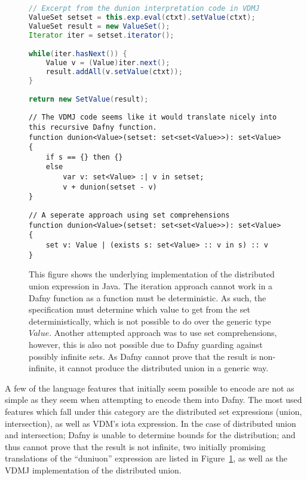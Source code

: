 \documentclass{entcs}
\begin{document}
\begin{figure}[h]
	\begin{center}
        \begin{lstlisting}[language=Java]
// Excerpt from the dunion interpretation code in VDMJ
ValueSet setset = this.exp.eval(ctxt).setValue(ctxt);
ValueSet result = new ValueSet();
Iterator iter = setset.iterator();

while(iter.hasNext()) {
    Value v = (Value)iter.next();
    result.addAll(v.setValue(ctxt));
}

return new SetValue(result);
        \end{lstlisting}
        \begin{lstlisting}[language=Dafny]
// The VDMJ code seems like it would translate nicely into this recursive Dafny function.
function dunion<Value>(setset: set<set<Value>>): set<Value> {
    if s == {} then {} 
    else 
        var v: set<Value> :| v in setset;
        v + dunion(setset - v)
}
        \end{lstlisting}
        \begin{lstlisting}[language=Dafny]
// A seperate approach using set comprehensions
function dunion<Value>(setset: set<set<Value>>): set<Value> {
    set v: Value | (exists s: set<Value> :: v in s) :: v
}
        \end{lstlisting}
		\caption{This figure shows the underlying implementation of the distributed union expression in Java. The iteration approach cannot work in a Dafny function as a function must be deterministic. As such, the specification must determine which value to get from the set deterministically, which is not possible to do over the generic type $Value$. Another attempted approach was to use set comprehensions, however, this is also not possible due to Dafny guarding against possibly infinite sets. As Dafny cannot prove that the result is non-infinite, it cannot produce the distributed union in a generic way.}\label{fig:java_dunion}
	\end{center}
\end{figure}

A few of the language features that initially seem possible to encode are not as simple as they seem when attempting to encode them into Dafny. The most used features which fall under this category are the distributed set expressions (union, intersection), as well as VDM's iota expression. In the case of distributed union and intersection; Dafny is unable to determine bounds for the distribution; and thus cannot prove that the result is not infinite, two initially promising translations of the ``duniuon'' expression are listed in Figure~\ref{fig:java_dunion}, as well as the VDMJ implementation of the distributed union.
\end{document}
